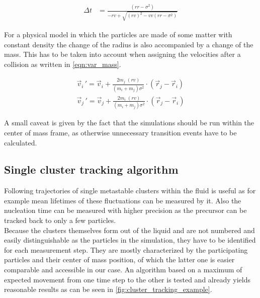 \begin{align}
\label{eqn:collision_prediction2}
\Delta t &= \frac{(rr - \sigma^2 )}{ - rv + \sqrt{ (rv)^2  - vv (rr - \sigma^2 )}}
\end{align} 

For a physical model in which the particles are made of some matter with constant density the change of the radius is also accompanied by a change of the mass. This has to be taken into account when assigning the velocities after a collision as written in \autoref{eqn:var_mass}.

\begin{align}
\label{eqn:var_mass}
\vec{v}_i{\,'} = \vec{v}_i + \frac{2 m_j \; (rv)}{(m_i + m_j) \sigma^2} \cdot (\vec{r}_j - \vec{r}_i) \nonumber \\
\vec{v}_j{\,'} = \vec{v}_j + \frac{2 m_i \; (rv)}{(m_i + m_j) \sigma^2} \cdot (\vec{r}_j - \vec{r}_i)
\end{align}

A small caveat is given by the fact that the simulations should be run within the center of mass frame, as otherwise unnecessary transition events have to be calculated.

\subsection{Single cluster tracking algorithm}
\label{sec:tracking}
Following trajectories of single metastable clusters within the fluid is useful as for example mean lifetimes of these fluctuations can be measured by it. Also the nucleation time can be measured with higher precision as the precursor can be tracked back to only a few particles.\\ 
Because the clusters themselves form out of the liquid and are not numbered and easily distinguishable as the particles in the simulation, they have to be identified for each measurement step. They are mostly characterized by the participating particles and their center of mass position, of which the latter one is easier comparable and accessible in our case. An algorithm based on a maximum of expected movement from one time step to the other is tested and already yields reasonable results as can be seen in \autoref{fig:cluster_tracking_example}.

